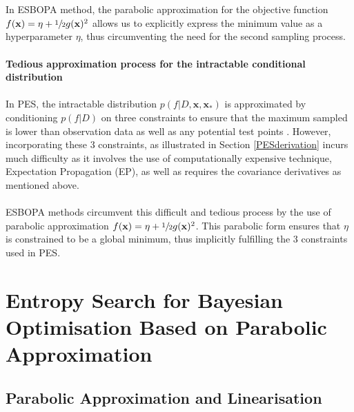 \documentclass[a4paper,11pt]{report}
\begin{document}
\\\\
In ESBOPA method, the parabolic approximation for the objective function $f(\mathbf{x}) =\eta+\sfrac{1}{2}g(\mathbf{x})^2 $ allows us to explicitly express the minimum value as a hyperparameter $\eta$, thus circumventing the need for the second sampling process. 
\\\\
\textbf{Tedious approximation process for the intractable conditional distribution} \label{Tediousapproximationprocess} 
\\\\
In PES, the intractable distribution $p(f \vert D, \mathbf{x}, \mathbf{x}_{*})$ is approximated by conditioning $p( f \vert D) $ on three constraints to ensure that the maximum sampled is lower than observation data as well as any potential test points \cite{hernandez2014predictive}. However, incorporating these 3 constraints, as illustrated in Section \ref{PESderivation} incurs much difficulty as it involves the use of computationally expensive technique, Expectation Propagation (EP), as well as requires the covariance derivatives as mentioned above. 
\\\\
ESBOPA methods circumvent this difficult and tedious process by the use of parabolic approximation $f(\mathbf{x}) =\eta+\sfrac{1}{2}g(\mathbf{x})^2 $. This parabolic form ensures that $\eta$ is constrained to be a global minimum, thus implicitly fulfilling the 3 constraints used in PES.  



\chapter{Entropy Search for Bayesian Optimisation Based on Parabolic Approximation}

\section{Parabolic Approximation and Linearisation} \label{prarabolicandlinearisation}
\end{document}
